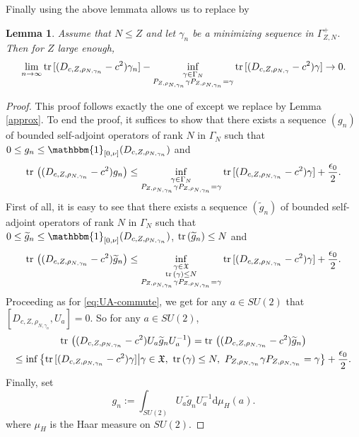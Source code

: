 \documentclass[a4paper]{amsart}
\newtheorem{lemma}{Lemma}
\def\tr{{\rm tr \,}}
\def\gX{\mathfrak{X}}
\def\rd{\mathrm{d}}
\begin{document}
Finally using the above lemmata allows us to replace \cite[Lemma
3.3]{Sere2023} by
\begin{lemma}
  Assume that $N\leq Z$ and let $\gamma_n$ be a minimizing sequence in
  $\Gamma_{Z,N}^+$.  Then for $Z$ large enough,
    \begin{equation}
        \lim_{n\to \infty}\tr[(D_{c,Z,\rho_{N,\gamma_n}}-c^2)\gamma_n]-\inf_{\substack{\gamma\in \Gamma_{N}\\ P_{Z,\rho_{N,\gamma_n}}\gamma P_{Z,\rho_{N,\gamma_n}} =\gamma}}\tr[(D_{c,Z,\rho_{N,\gamma}}-c^2)\gamma]\to 0.
    \end{equation}
\end{lemma}
\begin{proof}
  This proof follows exactly the one of \cite[Lemma 3.3]{Sere2023}
  except we replace \cite[Theorem 2.10]{Sere2023} by Lemma
  \ref{approx}. To end the proof, it suffices to show that there
  exists a sequence $(g_n)$ of bounded self-adjoint operators of rank
  $N$ in $\Gamma_N$ such that
  $0\leq g_n \leq \mathbbm{1}_{[0,\nu]}(D_{c,Z,\rho_{N,\gamma_n}})$
  and
\begin{equation}
  \tr\left((D_{c,Z,\rho_{N,\gamma_n}}-c^2)g_n\right)\leq \inf_{\substack{\gamma\in \Gamma_{N}\\ P_{Z,\rho_{N,\gamma_n}}\gamma P_{Z,\rho_{N,\gamma_n}} =\gamma}}\tr[(D_{c,Z,\rho_{N,\gamma_n}}-c^2)\gamma]+\frac{\epsilon_0}{2}.
\end{equation}
First of all, it is easy to see that there exists a sequence
$(\widetilde{g}_n)$ of bounded self-adjoint operators of rank $N$ in
$\Gamma_N$ such that
$0\leq \widetilde{g}_n \leq
\mathbbm{1}_{[0,\nu]}(D_{c,Z,\rho_{N,\gamma_n}})$,
$\tr(\widetilde{g}_n)\leq N$ and
\begin{equation}
    \tr\left((D_{c,Z,\rho_{N,\gamma_n}}-c^2)\widetilde{g}_n\right)\leq \inf_{\substack{\gamma\in\gX\\\tr(\gamma)\leq N \\ P_{Z,\rho_{N,\gamma_n}}\gamma P_{Z,\rho_{N,\gamma_n}} =\gamma}}\tr[(D_{c,Z,\rho_{N,\gamma_n}}-c^2)\gamma]+\frac{\epsilon_0}{2}.
\end{equation}
Proceeding as for \eqref{eq:UA-commute}, we get for any $a\in SU(2)$
that $[D_{c,Z,\rho_{N,\gamma_n}}, U_a]=0$.  So for any $a\in SU(2)$,
\begin{multline}
   \tr\left((D_{c,Z,\rho_{N,\gamma_n}}-c^2)U_a \widetilde{g}_n U_a^{-1}\right)
  = \tr\left((D_{c,Z,\rho_{N,\gamma_n}}-c^2)\widetilde{g}_n\right)\\
    \leq \inf\left\{\tr[(D_{c,Z,\rho_{N,\gamma_n}}-c^2)\gamma]\big|
           \gamma\in\gX,\ \tr(\gamma)\leq N,\ P_{Z,\rho_{N,\gamma_n}}\gamma P_{Z,\rho_{N,\gamma_n}} =\gamma\right\}
    +\frac{\epsilon_0}{2}.
\end{multline}
Finally, set
\begin{equation}
    g_n:=\int_{SU(2)}U_a \widetilde{g}_n U_a^{-1} \rd\mu_H(a). 
\end{equation}
where $\mu_H$ is the Haar measure on $SU(2)$.


\end{proof}
\end{document}
